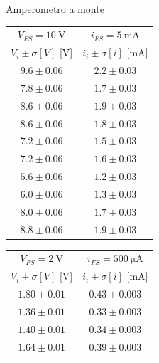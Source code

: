 \documentclass{article}
\begin{document}
\begin{figure}
\begin{center}
    \large{Amperometro a monte}
\end{center}
\begin{multicols}{2}
\begin{center}
\begin{tabular}{c|c} 
$V_{FS}=\SI{10}{\volt}$&$i_{FS}=\SI{5}{\milli\ampere}$\\
$V_i \pm \sigma [V]$ [\si{\volt}] & $i_i \pm \sigma [i]$ [\si{\milli\ampere}]\\
[0.5ex]
\hline
$9.6 \pm 0.06 $&$2.2 \pm 0.03$\\

$7.8 \pm 0.06 $&$1.7 \pm 0.03$\\

$8.6 \pm 0.06 $&$1.9 \pm 0.03$\\

$8.6 \pm 0.06 $&$1.8 \pm 0.03$\\

$7.2 \pm 0.06 $&$1.5 \pm 0.03$\\

$7.2 \pm 0.06 $&$1.6 \pm 0.03$\\

$5.6 \pm 0.06 $&$1.2 \pm 0.03$\\

$6.0 \pm 0.06 $&$1.3 \pm 0.03$\\

$8.0 \pm 0.06 $&$1.7 \pm 0.03$\\

$8.8 \pm 0.06 $&$1.9 \pm 0.03$\\

\end{tabular}
\end{center}

\begin{center}
\begin{tabular}{c|c} 
$V_{FS}=\SI{2}{\volt}$&$i_{FS}=\SI{500}{\micro\ampere}$\\
$V_i \pm \sigma [V]$        [\si{\volt}] & $i_i \pm \sigma [i]$         [\si{\milli\ampere}]\\
[0.5ex]
\hline
$1.80 \pm 0.01 $& $0.43 \pm 0.003$\\
$1.36 \pm 0.01 $&$0.33 \pm 0.003$\\

$1.40 \pm 0.01 $&$0.34 \pm 0.003$\\

$1.64 \pm 0.01 $&$0.39 \pm 0.003$\\


\end{tabular}
\end{center}
\end{multicols}
\end{figure}
\end{document}
